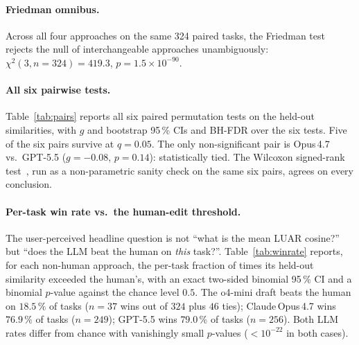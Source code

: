 \documentclass[runningheads]{llncs}
\begin{document}
\paragraph{Friedman omnibus.}
Across all four approaches on the same 324 paired tasks, the Friedman
test~\cite{friedman1937} rejects the null of interchangeable approaches
unambiguously: $\chi^{2}(3, n{=}324){=}419.3$,
$p{=}1.5\times10^{-90}$.

\paragraph{All six pairwise tests.}
Table~\ref{tab:pairs} reports all six paired permutation tests on the
held-out similarities, with $g$ and bootstrap 95\,\% CIs and BH-FDR
over the six tests. Five of the six pairs survive at $q{=}0.05$. The
only non-significant pair is Opus\,4.7 vs.\ GPT-5.5
($g{=}-0.08$, $p{=}0.14$): statistically tied. The Wilcoxon signed-rank
test~\cite{wilcoxon1945}, run as a non-parametric sanity check on the
same six pairs, agrees on every conclusion.

\begin{table}[t]
\centering
\caption{All-pairs paired permutation tests on the held-out
similarity (n{=}324). $\bar{x}_A$ and $\bar{x}_B$ are the per-task
means of approach $A$ and $B$. $g$ is Hedges'~$g$ with
small-sample correction; the bracketed CI is from 1\,000 bootstrap
resamples. $p$~(perm)~floor is $10^{-4}$. BH-FDR is over the six
tests at $q{=}0.05$; $p$~(BH) is the corrected $p$.}
\label{tab:pairs}

\end{table}

\paragraph{Per-task win rate vs.\ the human-edit threshold.}
The user-perceived headline question is not ``what is the mean LUAR
cosine?'' but ``does the LLM beat the human on \emph{this} task?''.
Table~\ref{tab:winrate} reports, for each non-human approach, the
per-task fraction of times its held-out similarity exceeded the
human's, with an exact two-sided binomial 95\,\% CI and a binomial
$p$-value against the chance level $0.5$. The o4-mini draft beats the
human on $18.5\,\%$ of tasks ($n{=}37$ wins out of $324$ plus $46$
ties); Claude\,Opus\,4.7 wins $76.9\,\%$ of tasks ($n{=}249$); GPT-5.5
wins $79.0\,\%$ of tasks ($n{=}256$). Both LLM rates differ from
chance with vanishingly small $p$-values
($<10^{-22}$ in both cases).
\end{document}
